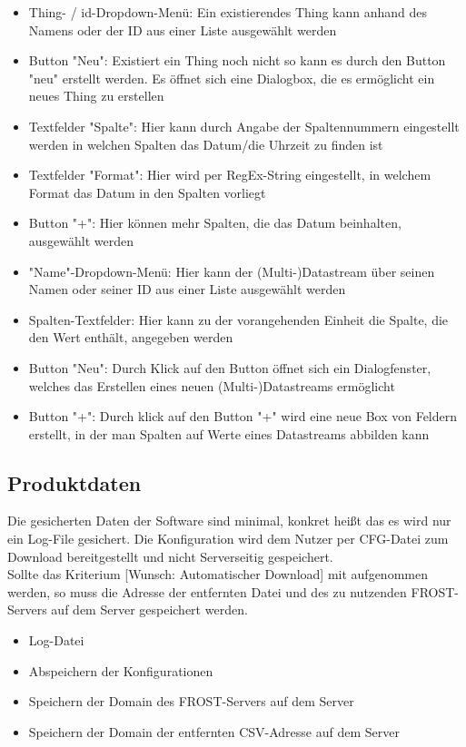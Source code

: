 \documentclass[12 pt]{article}
\begin{document}
\begin{itemize}
\item Thing- / id-Dropdown-Menü: Ein existierendes Thing kann anhand des Namens oder der ID aus einer Liste ausgewählt werden
\item Button "Neu": Existiert ein Thing noch nicht so kann es durch den Button "neu" erstellt werden. Es öffnet sich eine Dialogbox, die es ermöglicht ein neues Thing zu erstellen

\item Textfelder "Spalte": Hier kann durch Angabe der Spaltennummern eingestellt werden in welchen Spalten das Datum/die Uhrzeit zu finden ist
\item Textfelder "Format": Hier wird per RegEx-String eingestellt, in welchem Format das Datum in den Spalten vorliegt
\item Button "+": Hier können mehr Spalten, die das Datum beinhalten, ausgewählt werden

\item "Name"-Dropdown-Menü: Hier kann der (Multi-)Datastream über seinen Namen oder seiner ID aus einer Liste ausgewählt werden
\item Spalten-Textfelder: Hier kann zu der vorangehenden Einheit die Spalte, die den Wert enthält, angegeben werden
\item Button "Neu": Durch Klick auf den Button öffnet sich ein Dialogfenster, welches das Erstellen eines neuen (Multi-)Datastreams ermöglicht
\item Button "+": Durch klick auf den Button "+" wird eine neue Box von Feldern erstellt, in der man Spalten auf Werte eines Datastreams abbilden kann
\end{itemize}

\subsection{Produktdaten}
Die gesicherten Daten der Software sind minimal, konkret heißt das es wird nur ein Log-File gesichert. Die Konfiguration wird dem Nutzer per CFG-Datei zum Download bereitgestellt und nicht Serverseitig gespeichert.\\
Sollte das Kriterium [Wunsch: Automatischer Download] mit aufgenommen werden, so muss die Adresse der entfernten Datei und des zu nutzenden FROST-Servers auf dem Server gespeichert werden.
\begin{itemize}
\item Log-Datei
\item Abspeichern der Konfigurationen
\item Speichern der Domain des FROST-Servers auf dem Server
\item Speichern der Domain der entfernten CSV-Adresse auf dem Server
\end{itemize}
\end{document}

